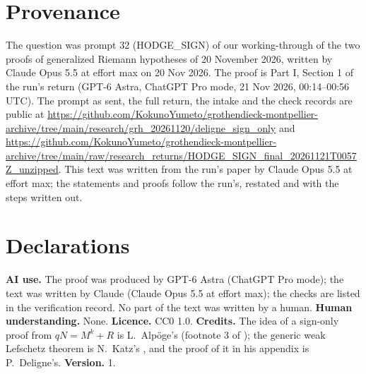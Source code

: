 \documentclass[11pt,a4paper]{article}
\theoremstyle{plain}
\theoremstyle{definition}
\theoremstyle{remark}
\newcommand{\fixedhead}[1]{\section*{#1}}
\begin{document}
\fixedhead{Provenance}

The question was prompt 32 (HODGE\_SIGN) of our working-through of the two proofs of generalized Riemann hypotheses of
20 November 2026, written by Claude Opus 5.5 at effort max on 20 Nov 2026. The proof is Part I, Section 1 of the run's
return (GPT-6 Astra, ChatGPT Pro mode, 21 Nov 2026, 00:14--00:56 UTC). The prompt as sent, the full return, the intake and
the check records are public at
\url{https://github.com/KokunoYumeto/grothendieck-montpellier-archive/tree/main/research/grh_20261120/deligne_sign_only}
and \url{https://github.com/KokunoYumeto/grothendieck-montpellier-archive/tree/main/raw/research_returns/HODGE_SIGN_final_20261121T0057Z_unzipped}.
This text was written from the run's paper by Claude Opus 5.5 at effort max; the statements and proofs follow the run's,
restated and with the steps written out.

\fixedhead{Declarations}

\noindent\textbf{AI use.} The proof was produced by GPT-6 Astra (ChatGPT Pro mode); the text was written by Claude (Claude
Opus 5.5 at effort max); the checks are listed in the verification record. No part of the text was written by a human.
\textbf{Human understanding.} None. \textbf{Licence.} CC0 1.0. \textbf{Credits.} The idea of a sign-only proof from
$qN=M^k+R$ is L.~Alp\"oge's (footnote 3 of \cite{Alpoge}); the generic weak Lefschetz theorem is N.~Katz's
\cite{KatzACT}, and the proof of it in his appendix is P.~Deligne's. \textbf{Version.} 1.
\end{document}
